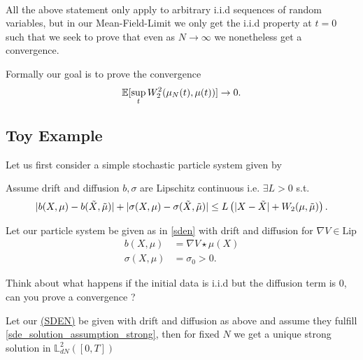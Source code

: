 \hspace{0mm}\\[1ex]
All the above statement only apply to arbitrary i.i.d sequences of random variables, but in our Mean-Field-Limit we only get 
the i.i.d property at $t=0$ such that we seek to prove that even as $N \to \infty$ we nonetheless get a convergence.
\begin{remark}
 Formally our goal is to prove the convergence 
 \begin{align*}
   \mathbb{E}[\sup_{t} W_2^{2}(\mu_N(t),\mu(t))  ] \to 0
 .\end{align*}
\end{remark}
\newpage
\subsection{Toy Example}
Let us first consider a simple stochastic particle system given by 
\begin{assumption}\label{sde_solution_assumption_strong}
Assume drift and diffusion $b,\sigma $   are Lipschitz continuous i.e. $\exists  L >0$ s.t.
 \begin{align*}
  \lvert b(X,\mu ) - b(\tilde{X},\tilde{\mu }  )\rvert + \lvert\sigma(X,\mu ) - \sigma(\tilde{X},\tilde{\mu }  )\rvert \le  L \left( \lvert X - \tilde{X} \rvert + W_2(\mu ,\tilde{\mu } ) \right) 
 .\end{align*}
\end{assumption}
\begin{example}
  Let our particle system be given as in \autoref{sden} with drift and diffusion for $\nabla V \in  \text{Lip}$
 \begin{align*}
   b(X,\mu )&= \nabla V \star  \mu(X)\\
   \sigma(X,\mu ) &= \sigma_0 >0
 .\end{align*}
\end{example}
\begin{exercise}
 Think about what happens if the initial data is i.i.d but the diffusion term is 0, can you prove a convergence ?
\end{exercise}
\begin{theorem}
  Let our \hyperref[sden]{(SDEN)} be given with drift and diffusion as above and assume they fulfill \autoref{sde_solution_assumption_strong}, then  
  for fixed $N$ we get a unique strong solution in $\mathbb{L}^{2}_{dN}([0,T]) $
\end{theorem}
